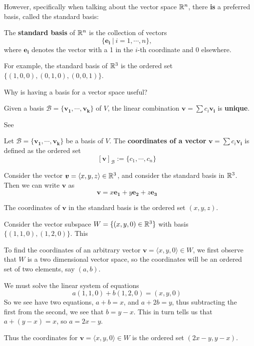     However, specifically when talking about the vector space $\mathbb{R}^n$, there \textbf{is} a preferred basis, called the standard basis:
    
    \begin{definition}
    The \textbf{standard basis} of $\mathbb{R}^n$ is the collection of vectors $$\{\bm{e_i} \ | \ i = 1, \cdots, n\},$$ where $\bm{e_i}$ denotes the vector with a 1 in the $i$-th coordinate and 0 elsewhere.
    \end{definition}
    
    \begin{example}
    For example, the standard basis of $\mathbb{R}^3$ is the ordered set $\{(1,0,0), (0,1,0), (0,0,1)\}$.
    \end{example}
    
    \begin{motivating}
    Why is having a basis for a vector space useful?
    \end{motivating}
    
    
    
    \begin{theorem}\label{thm:basisunique}
    Given a basis $\mathscr{B} = \{\bm{v_1}, \cdots, \bm{v_k}\}$ of $V$, the linear combination $\bm{v} = \sum c_i \bm{v_i}$ is \textbf{unique}.
    \end{theorem}
    
    See
    
    \begin{definition}
    Let $\mathscr{B} = \{\bm{v_1}, \cdots, \bm{v_k}\}$ be a basis of $V$.  The \textbf{coordinates of a vector} $\bm{v} = \sum c_i \bm{v_i}$ is defined as the ordered set
    $$[\bm{v}]_\mathscr{B} := \{c_1, \cdots, c_n\}$$
    \end{definition}

    \begin{example}
    Consider the vector $\bm{v} = \langle x, y,z \rangle \in \mathbb{R}^3$, and consider the standard basis in $\mathbb{R}^3$.  Then we can write $\bm{v}$ as
    $$\bm{v} = x\bm{e_1} + y\bm{e_2} + z\bm{e_3}$$
    
    The coordinates of $\bm{v}$ in the standard basis is the ordered set $(x,y,z)$.
    \end{example}
    
    \begin{example}
    Consider the vector subspace $W = \{(x, y, 0) \in \mathbb{R}^3 \}$ with basis $\{(1,1,0),(1,2,0)\}$.  This 
    
    To find the coordinates of an arbitrary vector $\bm{v} = \langle x, y,0 \rangle \in W$, we first observe that $W$ is a two dimensional vector space, so the coordinates will be an ordered set of two elements, say $(a,b)$.
    
    We must solve the linear system of equations $$a(1,1,0) + b(1,2,0) = (x,y,0)$$
    So we see have two equations, $a + b = x$, and $a+2b=y$, thus subtracting the first from the second, we see that $b = y-x$.  This in turn tells us that $a + (y-x) =x$, so $a = 2x-y$.
    
    Thus the coordinates for $\bm{v} = \langle x, y,0 \rangle \in W$ is the ordered set $(2x-y, y-x)$.
    \end{example}
    
